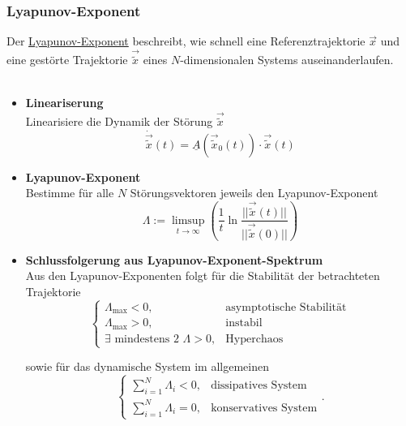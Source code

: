 \documentclass{article}
\newcommand{\lr}[1]{\left(#1\right)}
\begin{document}
\subsubsection{Lyapunov-Exponent}
Der \underline{Lyapunov-Exponent} beschreibt, wie schnell eine Referenztrajektorie $\vec{x}$ und eine gestörte Trajektorie $\vec{\tilde{x}}$ eines $N$-dimensionalen Systems auseinanderlaufen.\\
\\
	\begin{itemize}
		\item \textbf{Lineariserung}\\
		Linearisiere die Dynamik der Störung $\vec{\tilde{x}}$
			\begin{equation}
				\dot{\vec{\tilde{x}}}(t) = \underline{A}(\vec{\tilde{x}}_0(t)) \cdot \vec{\tilde{x}}(t)
			\end{equation}
		
		
		\item \textbf{Lyapunov-Exponent}\\
		Bestimme für alle $N$ Störungsvektoren jeweils den Lyapunov-Exponent
			\begin{equation}
				\Lambda := \limsup_{t \to \infty} \lr{ \frac{1}{t} \ln \frac{||\vec{\tilde{x}}(t)||}{||\vec{\tilde{x}}(0)||} }
			\end{equation}
		
		
		\item \textbf{Schlussfolgerung aus Lyapunov-Exponent-Spektrum}\\
		Aus den Lyapunov-Exponenten folgt für die Stabilität der betrachteten Trajektorie
			\begin{equation}
				\begin{cases}
					\Lambda_\text{max} < 0, & \text{asymptotische Stabilität} \\
					\Lambda_\text{max} > 0, & \text{instabil} \\
					\text{$\exists$ mindestens 2 } \Lambda > 0, & \text{Hyperchaos}					
				\end{cases}
			\end{equation}
		
		sowie für das dynamische System im allgemeinen
			\begin{equation}
				\begin{cases}
					\sum_{i=1}^N \Lambda_i < 0, & \text{dissipatives System} \\
					\sum_{i=1}^N \Lambda_i = 0, & \text{konservatives System}
				\end{cases}.
			\end{equation}
	\end{itemize}
	
\end{document}

